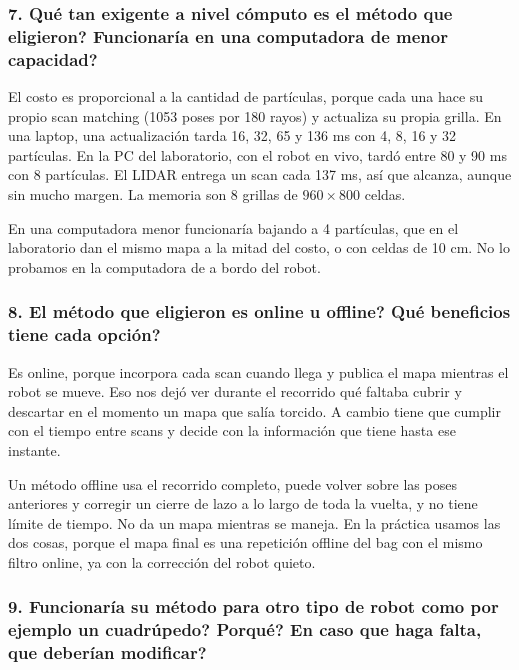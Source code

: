 \subsubsection*{7. \textquestiondown{}Qué tan exigente a nivel cómputo es el método que eligieron? \textquestiondown{}Funcionaría en una computadora de menor capacidad?}

El costo es proporcional a la cantidad de partículas, porque cada una hace su
propio scan matching (1053 poses por 180 rayos) y actualiza su propia grilla.
En una laptop, una actualización tarda 16, 32, 65 y 136 ms con 4, 8, 16 y 32
partículas. En la PC del laboratorio, con el robot en vivo, tardó entre 80 y
90 ms con 8 partículas. El LIDAR entrega un scan cada 137 ms, así que alcanza,
aunque sin mucho margen. La memoria son 8 grillas de $960 \times 800$ celdas.

En una computadora menor funcionaría bajando a 4 partículas, que en el
laboratorio dan el mismo mapa a la mitad del costo, o con celdas de 10 cm. No
lo probamos en la computadora de a bordo del robot.

\subsubsection*{8. \textquestiondown{}El método que eligieron es online u offline? \textquestiondown{}Qué beneficios tiene cada opción?}

Es online, porque incorpora cada scan cuando llega y publica el mapa mientras
el robot se mueve. Eso nos dejó ver durante el recorrido qué faltaba cubrir y
descartar en el momento un mapa que salía torcido. A cambio tiene que cumplir
con el tiempo entre scans y decide con la información que tiene hasta ese
instante.

Un método offline usa el recorrido completo, puede volver sobre las poses
anteriores y corregir un cierre de lazo a lo largo de toda la vuelta, y no
tiene límite de tiempo. No da un mapa mientras se maneja. En la práctica usamos
las dos cosas, porque el mapa final es una repetición offline del bag con el
mismo filtro online, ya con la corrección del robot quieto.

\subsubsection*{9. \textquestiondown{}Funcionaría su método para otro tipo de robot como por ejemplo un cuadrúpedo? \textquestiondown{}Porqué? \textquestiondown{}En caso que haga falta, que deberían modificar?}

